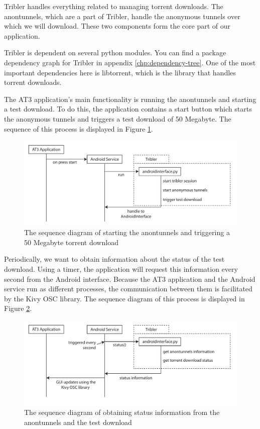 Tribler handles everything related to managing torrent downloads. The anontunnels, which are a part of Tribler, handle the anonymous tunnels over which we will download. These two components form the core part of our application.

Tribler is dependent on several python modules. You can find a package dependency graph for Tribler in appendix \ref{chp:dependency-tree}. One of the most important dependencies here is libtorrent, which is the library that handles torrent downloads.

The AT3 application's main functionality is running the anontunnels and starting a test download. To do this, the application contains a start button which starts the anonymous tunnels and triggers a test download of 50 Megabyte. The sequence of this process is displayed in Figure \ref{fig:sequencestart}.

\begin{figure}[!h]
	\centering
	\includegraphics[width=\textwidth]{graphics/sequence-start.pdf}
	\caption{The sequence diagram of starting the anontunnels and triggering a 50 Megabyte torrent download}
	\label{fig:sequencestart}
\end{figure}

Periodically, we want to obtain information about the status of the test download. Using a timer, the application will request this information every second from the Android interface. Because the AT3 application and the Android service run as different processes, the communication between them is facilitated by the Kivy OSC library. The sequence diagram of this process is displayed in Figure \ref{fig:sequenceinfo}.

\begin{figure}[!t]
	\centering
	\includegraphics[width=\textwidth]{graphics/sequence-info.pdf}
	\caption{The sequence diagram of obtaining status information from the anontunnels and the test download}
	\label{fig:sequenceinfo}
\end{figure}

